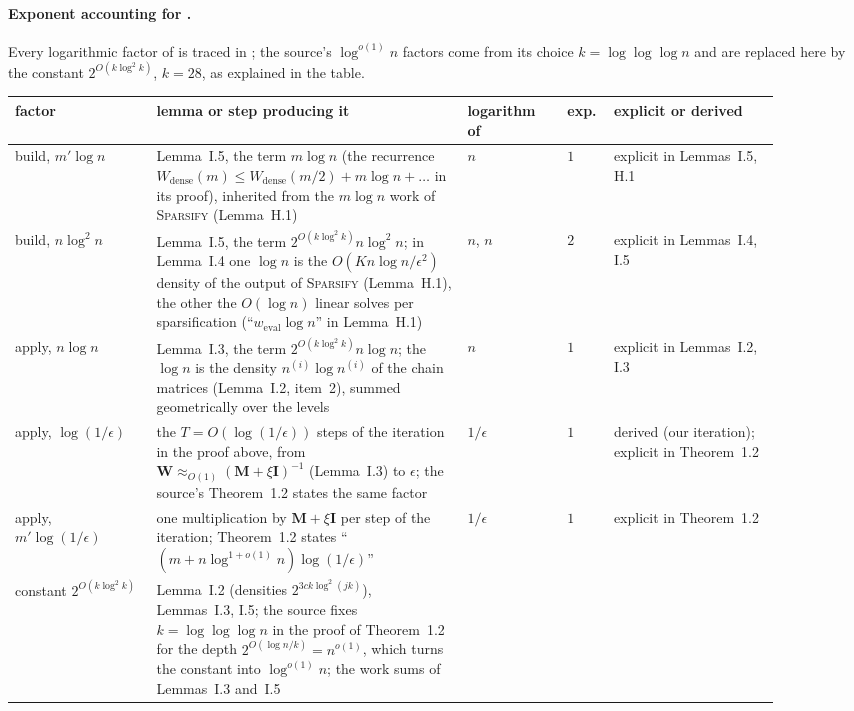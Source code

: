 \documentclass[11pt]{article}
\theoremstyle{remark}
\newcommand{\II}{\mathbf I}
\newcommand{\MM}{\mathbf M}
\newcommand{\WW}{\mathbf W}
\begin{document}
\paragraph{Exponent accounting for .}
Every logarithmic factor of  is traced in
; the source's $\log^{o(1)}n$ factors come from
its choice $k=\log\log\log n$ and are replaced here by the constant
$2^{O(k\log^{2}k)}$, $k=28$, as explained in the table.
\begin{table}[H]\centering\footnotesize
\begin{tabular}{@{}p{0.17\linewidth}p{0.35\linewidth}p{0.12\linewidth}%
p{0.05\linewidth}p{0.2\linewidth}@{}}
\toprule
factor & lemma or step producing it & logarithm of & exp. &
explicit or derived\\
\midrule
build, $m'\log n$ & Lemma~I.5, the term $m\log n$ (the recurrence
$W_{\mathrm{dense}}(m)\le W_{\mathrm{dense}}(m/2)+m\log n+\dots$ in its
proof), inherited from the $m\log n$ work of \textsc{Sparsify}
(Lemma~H.1) & $n$ & $1$ & explicit in Lemmas~I.5, H.1\\
build, $n\log^{2}n$ & Lemma~I.5, the term $2^{O(k\log^{2}k)}n\log^{2}n$;
in Lemma~I.4 one $\log n$ is the $O(Kn\log n/\epsilon^{2})$ density of
the output of \textsc{Sparsify} (Lemma~H.1), the other the
$O(\log n)$ linear solves per sparsification
(``$w_{\mathrm{eval}}\log n$'' in Lemma~H.1) & $n$, $n$ & $2$ & explicit
in Lemmas~I.4, I.5\\
apply, $n\log n$ & Lemma~I.3, the term $2^{O(k\log^{2}k)}n\log n$; the
$\log n$ is the density $n^{(i)}\log n^{(i)}$ of the chain matrices
(Lemma~I.2, item~2), summed geometrically over the levels & $n$ & $1$ &
explicit in Lemmas~I.2, I.3\\
apply, $\log(1/\epsilon)$ & the $T=O(\log(1/\epsilon))$ steps of the
iteration in the proof above, from $\WW\approx_{O(1)}(\MM+\xi\II)^{-1}$
(Lemma~I.3) to $\epsilon$; the source's Theorem~1.2 states the same
factor & $1/\epsilon$ & $1$ & derived (our iteration); explicit in
Theorem~1.2\\
apply, $m'\log(1/\epsilon)$ & one multiplication by $\MM+\xi\II$ per step
of the iteration; Theorem~1.2 states ``$(m+n\log^{1+o(1)}n)\log(1/\epsilon)$''
& $1/\epsilon$ & $1$ & explicit in Theorem~1.2\\
constant $2^{O(k\log^{2}k)}$ & Lemma~I.2 (densities $2^{3ck\log^{2}(jk)}$),
Lemmas~I.3, I.5; the source fixes $k=\log\log\log n$ in the proof of
Theorem~1.2 for the depth $2^{O(\log n/k)}=n^{o(1)}$, which turns the
constant into $\log^{o(1)}n$; the work sums of Lemmas~I.3 and~I.5

\end{tabular}
\end{table}
\end{document}
